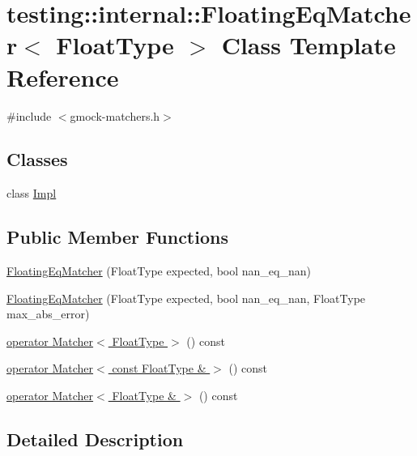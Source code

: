 \hypertarget{classtesting_1_1internal_1_1_floating_eq_matcher}{}\section{testing\+:\+:internal\+:\+:Floating\+Eq\+Matcher$<$ Float\+Type $>$ Class Template Reference}
\label{classtesting_1_1internal_1_1_floating_eq_matcher}


{\ttfamily \#include $<$gmock-\/matchers.\+h$>$}

\subsection*{Classes}
\begin{DoxyCompactItemize}
\item 
class \hyperlink{classtesting_1_1internal_1_1_floating_eq_matcher_1_1_impl}{Impl}
\end{DoxyCompactItemize}
\subsection*{Public Member Functions}
\begin{DoxyCompactItemize}
\item 
\hyperlink{classtesting_1_1internal_1_1_floating_eq_matcher_a92b08d1635c900fa8571ff4eff30b4bb}{Floating\+Eq\+Matcher} (Float\+Type expected, bool nan\+\_\+eq\+\_\+nan)
\item 
\hyperlink{classtesting_1_1internal_1_1_floating_eq_matcher_a07674c4b017965493a3c20a218f9a74f}{Floating\+Eq\+Matcher} (Float\+Type expected, bool nan\+\_\+eq\+\_\+nan, Float\+Type max\+\_\+abs\+\_\+error)
\item 
\hyperlink{classtesting_1_1internal_1_1_floating_eq_matcher_a47f1fa99b7084305a12b1020a44bc29a}{operator Matcher$<$ Float\+Type $>$} () const 
\item 
\hyperlink{classtesting_1_1internal_1_1_floating_eq_matcher_a9eed31cc28d3fae708bfbc8ec563bfa1}{operator Matcher$<$ const Float\+Type \& $>$} () const 
\item 
\hyperlink{classtesting_1_1internal_1_1_floating_eq_matcher_ae2b1077d781adb0543b35562897d5fed}{operator Matcher$<$ Float\+Type \& $>$} () const 
\end{DoxyCompactItemize}


\subsection{Detailed Description}
